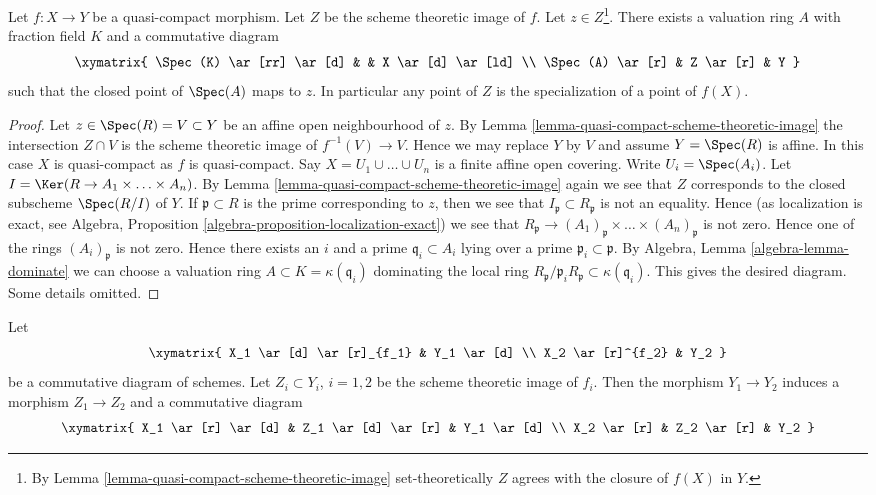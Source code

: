 \begin{lemma}
\label{lemma-reach-points-scheme-theoretic-image}
Let $f : X \to Y$ be a quasi-compact morphism.
Let $Z$ be the scheme theoretic image of $f$.
Let $z \in Z$\footnote{By
Lemma \ref{lemma-quasi-compact-scheme-theoretic-image} set-theoretically
$Z$ agrees with the closure of $f(X)$ in $Y$.}.
There exists a valuation ring $A$ with
fraction field $K$ and a commutative diagram
$$
\xymatrix{
\Spec(K) \ar[rr] \ar[d] & & X \ar[d] \ar[ld] \\
\Spec(A) \ar[r] & Z \ar[r] & Y
}
$$
such that the closed point of $\Spec(A)$ maps to $z$. In particular
any point of $Z$ is the specialization of a point of $f(X)$.
\end{lemma}

\begin{proof}
Let $z \in \Spec(R) = V \subset Y$ be an affine open
neighbourhood of $z$. By
Lemma \ref{lemma-quasi-compact-scheme-theoretic-image}
the intersection $Z \cap V$ is the scheme theoretic image of
$f^{-1}(V) \to V$. Hence we may replace $Y$ by $V$
and assume $Y = \Spec(R)$ is affine.
In this case $X$ is quasi-compact as $f$ is quasi-compact.
Say $X = U_1 \cup \ldots \cup U_n$
is a finite affine open covering. Write $U_i = \Spec(A_i)$.
Let $I = \Ker(R \to A_1 \times \ldots \times A_n)$.
By Lemma \ref{lemma-quasi-compact-scheme-theoretic-image}
again we see that $Z$ corresponds to the closed subscheme
$\Spec(R/I)$ of $Y$. If $\mathfrak p \subset R$ is
the prime corresponding to $z$, then we see that
$I_{\mathfrak p} \subset R_{\mathfrak p}$ is not an
equality. Hence (as localization is exact, see
Algebra, Proposition \ref{algebra-proposition-localization-exact})
we see that
$R_{\mathfrak p} \to
(A_1)_{\mathfrak p} \times \ldots \times (A_n)_{\mathfrak p}$
is not zero. Hence one of the rings $(A_i)_{\mathfrak p}$ is not zero.
Hence there exists an $i$ and a prime $\mathfrak q_i \subset A_i$
lying over a prime $\mathfrak p_i \subset \mathfrak p$.
By Algebra, Lemma \ref{algebra-lemma-dominate} we can choose a valuation ring
$A \subset K = \kappa(\mathfrak q_i)$ dominating
the local ring
$R_{\mathfrak p}/\mathfrak p_iR_{\mathfrak p} \subset \kappa(\mathfrak q_i)$.
This gives the desired diagram. Some details omitted.
\end{proof}

\begin{lemma}
\label{lemma-factor-factor}
Let
$$
\xymatrix{
X_1 \ar[d] \ar[r]_{f_1} & Y_1 \ar[d] \\
X_2 \ar[r]^{f_2} & Y_2
}
$$
be a commutative diagram of schemes. Let $Z_i \subset Y_i$, $i = 1, 2$ be
the scheme theoretic image of $f_i$. Then the morphism
$Y_1 \to Y_2$ induces a morphism $Z_1 \to Z_2$ and a
commutative diagram
$$
\xymatrix{
X_1 \ar[r] \ar[d] & Z_1 \ar[d] \ar[r] & Y_1 \ar[d] \\
X_2 \ar[r] & Z_2 \ar[r] & Y_2
}
$$
\end{lemma}

